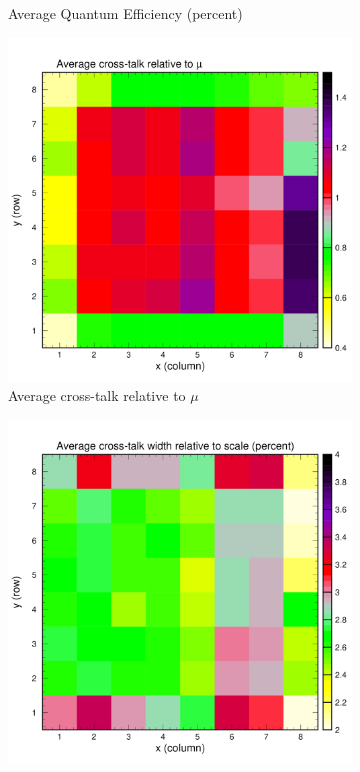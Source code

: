 \begin{figure}[hbt]
\begin{subfigure}[c]{0.4\linewidth}
		\caption{Average Quantum Efficiency (percent)}
		\vspace{0mm}
	\end{subfigure}%
	\vspace{3mm}
	\begin{subfigure}[c]{0.4\linewidth}
		\centering
		\includegraphics[width=\linewidth, trim={0mm 0mm 0mm 19mm},clip]{figures/pglobal_beta.pdf}
		\caption{Average cross-talk relative to $\mu$}
		\vspace{0mm}
	\end{subfigure}%
	\begin{subfigure}[c]{0.4\linewidth}
		\centering
		\includegraphics[width=\linewidth, trim={0mm 0mm 0mm 19mm},clip]{figures/pglobal_zeta.pdf}

\end{subfigure}
\end{figure}
